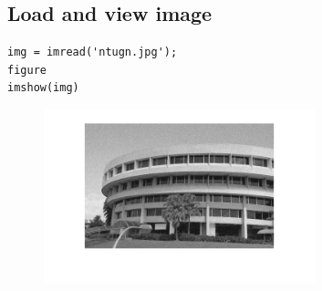 \documentclass[12pt, a4paper]{article}
\begin{document}
\subsection{Load and view image}
\begin{verbatim}
img = imread('ntugn.jpg');
figure
imshow(img)
\end{verbatim}
\begin{figure}[H]
    \centering
    \includegraphics[width=0.7\textwidth]{fig11.png}
\end{figure}
\end{document}
